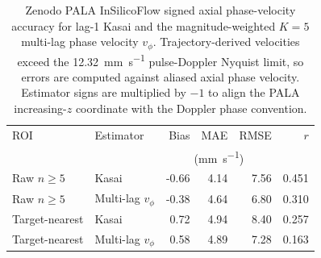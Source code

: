 \begin{table}[t]
\centering
\caption{Zenodo PALA InSilicoFlow signed axial phase-velocity
  accuracy for lag-1 Kasai and the magnitude-weighted $K=5$ multi-lag
  phase velocity $v_\phi$.
  Trajectory-derived velocities exceed the \SI{12.32}{\milli\meter\per\second}
  pulse-Doppler Nyquist limit, so errors are computed against aliased
  axial phase velocity.  Estimator signs are multiplied by $-1$ to
  align the PALA increasing-$z$ coordinate with the Doppler phase
  convention.}
\label{tab:zenodo_velocity_accuracy}
\scriptsize
\setlength{\tabcolsep}{3.5pt}
\begin{tabular}{@{}llrrrr@{}}
\toprule
ROI & Estimator & Bias & MAE & RMSE & $r$ \\
 & & \multicolumn{3}{c}{(\si{\milli\meter\per\second})} & \\
\midrule
Raw $n\ge5$ & Kasai & -0.66 & 4.14 & 7.56 & 0.451 \\
Raw $n\ge5$ & Multi-lag $v_\phi$ & -0.38 & 4.64 & 6.80 & 0.310 \\
Target-nearest & Kasai & 0.72 & 4.94 & 8.40 & 0.257 \\
Target-nearest & Multi-lag $v_\phi$ & 0.58 & 4.89 & 7.28 & 0.163 \\
\bottomrule
\end{tabular}
\end{table}
